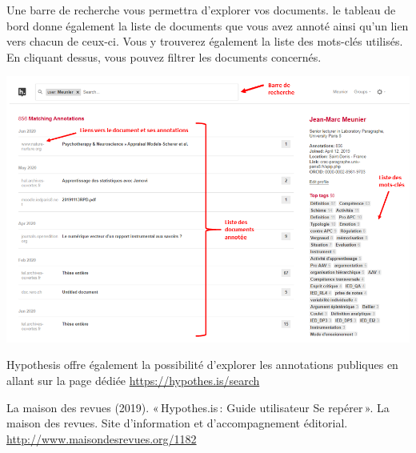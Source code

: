 \documentclass[
]{book}
\begin{document}
Une barre de recherche vous permettra d'explorer vos documents. le tableau de bord donne également la liste de documents que vous avez annoté ainsi qu'un lien vers chacun de ceux-ci. Vous y trouverez également la liste des mots-clés utilisés. En cliquant dessus, vous pouvez filtrer les documents concernés.

\includegraphics{img/dashboard.png}

Hypothesis offre également la possibilité d'explorer les annotations publiques en allant sur la page dédiée \url{https://hypothes.is/search}

La maison des revues (2019). «\,Hypothes.is\,: Guide utilisateur Se repérer\,». La maison des revues. Site d'information et d'accompagnement éditorial. \url{http://www.maisondesrevues.org/1182}

\backmatter
  
\end{document}
